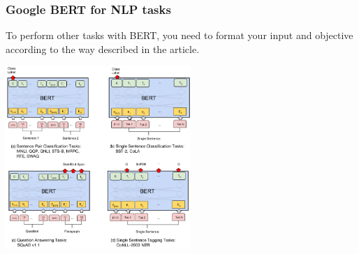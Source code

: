 \documentclass[9pt]{beamer}
\begin{document}
\begin{frame}
  \frametitle{Google BERT for NLP tasks}

  To perform other tasks with BERT, you need to format your input and
  objective according to the way described in the article.

  \begin{center}
    \includegraphics[width = 7cm]{images/bert.png}
  \end{center}
\end{frame}
\end{document}
